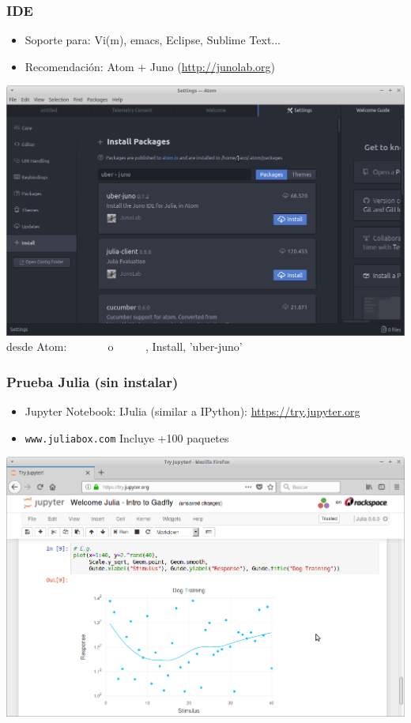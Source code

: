 \documentclass{beamer}
\providecommand{\comando}[1]{\texttt{\colorbox{morado_w}{\textcolor{white}{#1}}}}
\begin{document}
\begin{frame}
\frametitle{IDE}
\begin{itemize}
	\item Soporte para: Vi(m), emacs, Eclipse, Sublime Text...
	\item Recomendación: Atom + Juno (\url{http://junolab.org})
\end{itemize}
\begin{center}
	\includegraphics[scale=0.20]{images/atom-juno}\\
	\small{desde Atom: \comando{Ctrl ,} o \comando{Cmd ,},  Install, 'uber-juno'}
\end{center}
\end{frame}

\begin{frame}
\frametitle{Prueba Julia (sin instalar)}
\begin{itemize}
	\item Jupyter Notebook: IJulia (similar a IPython): \url{https://try.jupyter.org}
	\item \texttt{www.juliabox.com} Incluye +100 paquetes
\end{itemize}
\begin{center}
	\includegraphics[scale=0.25]{images/jupyter-julia}
\end{center}
\end{frame}
\end{document}

